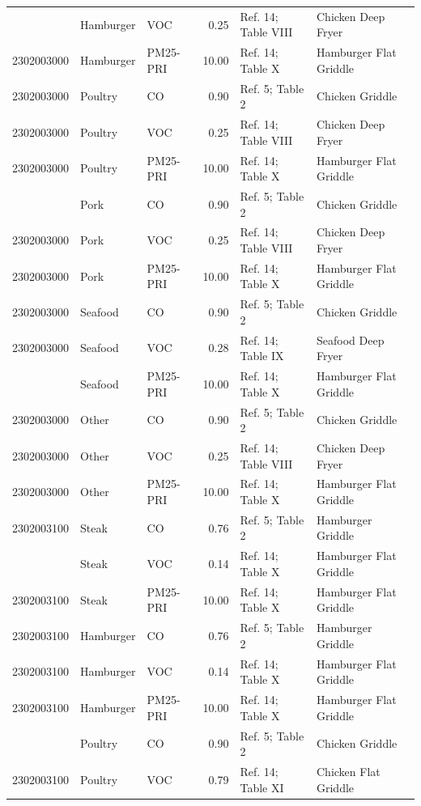 \documentclass[
  11pt,
  oneside]{book}
\begin{document}
\begin{table}[H]
{\begin{tabular}[t]{rllrll}
\addlinespace
2302003000 & Hamburger & VOC & 0.25 & Ref. 14; Table VIII & Chicken Deep Fryer\\
2302003000 & Hamburger & PM25-PRI & 10.00 & Ref. 14; Table X & Hamburger Flat Griddle\\
2302003000 & Poultry & CO & 0.90 & Ref. 5; Table 2 & Chicken Griddle\\
2302003000 & Poultry & VOC & 0.25 & Ref. 14; Table VIII & Chicken Deep Fryer\\
2302003000 & Poultry & PM25-PRI & 10.00 & Ref. 14; Table X & Hamburger Flat Griddle\\
\addlinespace
2302003000 & Pork & CO & 0.90 & Ref. 5; Table 2 & Chicken Griddle\\
2302003000 & Pork & VOC & 0.25 & Ref. 14; Table VIII & Chicken Deep Fryer\\
2302003000 & Pork & PM25-PRI & 10.00 & Ref. 14; Table X & Hamburger Flat Griddle\\
2302003000 & Seafood & CO & 0.90 & Ref. 5; Table 2 & Chicken Griddle\\
2302003000 & Seafood & VOC & 0.28 & Ref. 14; Table IX & Seafood Deep Fryer\\
\addlinespace
2302003000 & Seafood & PM25-PRI & 10.00 & Ref. 14; Table X & Hamburger Flat Griddle\\
2302003000 & Other & CO & 0.90 & Ref. 5; Table 2 & Chicken Griddle\\
2302003000 & Other & VOC & 0.25 & Ref. 14; Table VIII & Chicken Deep Fryer\\
2302003000 & Other & PM25-PRI & 10.00 & Ref. 14; Table X & Hamburger Flat Griddle\\
2302003100 & Steak & CO & 0.76 & Ref. 5; Table 2 & Hamburger Griddle\\
\addlinespace
2302003100 & Steak & VOC & 0.14 & Ref. 14; Table X & Hamburger Flat Griddle\\
2302003100 & Steak & PM25-PRI & 10.00 & Ref. 14; Table X & Hamburger Flat Griddle\\
2302003100 & Hamburger & CO & 0.76 & Ref. 5; Table 2 & Hamburger Griddle\\
2302003100 & Hamburger & VOC & 0.14 & Ref. 14; Table X & Hamburger Flat Griddle\\
2302003100 & Hamburger & PM25-PRI & 10.00 & Ref. 14; Table X & Hamburger Flat Griddle\\
\addlinespace
2302003100 & Poultry & CO & 0.90 & Ref. 5; Table 2 & Chicken Griddle\\
2302003100 & Poultry & VOC & 0.79 & Ref. 14; Table XI & Chicken Flat Griddle\\

\end{tabular}}
\end{table}
\end{document}
